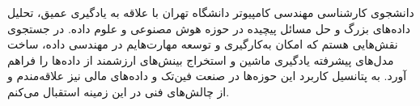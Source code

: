 

\begin{cvparagraph}


دانشجوی کارشناسی مهندسی کامپیوتر دانشگاه تهران با علاقه به یادگیری عمیق، تحلیل داده‌های بزرگ و حل مسائل پیچیده در حوزه هوش مصنوعی و علوم داده. در جستجوی نقش‌هایی هستم که امکان به‌کارگیری و توسعه مهارت‌هایم در مهندسی داده، ساخت مدل‌های پیشرفته یادگیری ماشین و استخراج بینش‌های ارزشمند از داده‌ها را فراهم آورد. به پتانسیل کاربرد این حوزه‌ها در صنعت فین‌تک و داده‌های مالی نیز علاقه‌مندم و از چالش‌های فنی در این زمینه استقبال می‌کنم.
\end{cvparagraph}
